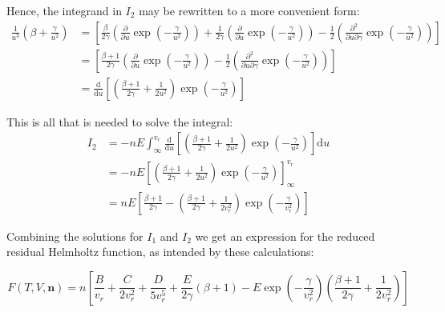 \documentclass[english]{../thermomemo/thermomemo}
\numberwithin{equation}{section}
\newcommand*{\pd}[2]{\frac{\partial #1}{\partial #2}}
\begin{document}
Hence, the integrand in $I_2$ may be rewritten to a more convenient form:
\begin{equation}
\begin{split}
\frac{1}{u^3} \left(\beta + \frac{\gamma}{u^2}\right) 
& = \left[ \frac{\beta}{2 \gamma} \left( \pd{}{u} \exp{\left(-\frac{\gamma}{u^2} \right) } \right) + \frac{1}{2 \gamma} \left( \pd{}{u} \exp{\left(-\frac{\gamma}{u^2} \right) } \right) - \frac{1}{2} \left(\frac{\partial^2}{\partial u \partial \gamma} \exp{\left(-\frac{\gamma}{u^2}\right)} \right) \right] \\
& = \left[\frac{\beta + 1}{2 \gamma} \left( \pd{}{u} \exp{\left(-\frac{\gamma}{u^2} \right)} \right) - \frac{1}{2} \left(\frac{\partial^2}{\partial u \partial \gamma} \exp{\left(-\frac{\gamma}{u^2}\right)} \right) \right] \\
& = \frac{\mathrm{d}}{\mathrm{d}u} \left[\left( \frac{\beta + 1}{2 \gamma} + \frac{1}{2u^2} \right)\exp{\left(-\frac{\gamma}{u^2}\right)} \right] 
\end{split}
\end{equation}

This is all that is needed to solve the integral:
\begin{equation}
\begin{split}
I_2 
& = - n E\int_\infty ^{v_r} \frac{\mathrm{d}}{\mathrm{d}u} \left[\left( \frac{\beta + 1}{2 \gamma} + \frac{1}{2u^2} \right)\exp{\left(-\frac{\gamma}{u^2}\right)} \right]  \mathrm{d}u \\
& =  - n E{ \left[\left( \frac{\beta + 1}{2 \gamma} + \frac{1}{2u^2} \right)\exp{\left(-\frac{\gamma}{u^2}\right)} \right] }_ \infty ^{v_r} \\
& = n E\left[\frac{\beta + 1}{2 \gamma} - \left( \frac{\beta + 1}{2 \gamma} + \frac{1}{2v_r^2} \right)\exp{\left(-\frac{\gamma}{v_r^2}\right)} \right]
\end{split}
\end{equation}

Combining the solutions for $I_1$ and $I_2$ we get an expression for the reduced residual Helmholtz function, as intended by these calculations:

\begin{equation}
F(T,V,\textbf{n}) = n \left[\frac{B}{v_r} + \frac{C}{2 v_r^2} + \frac{D}{5 v_r^5} + \frac{E}{2 \gamma}(\beta + 1) - E\exp{\left(-\frac{\gamma}{v_r^2}\right)} \left( \frac{\beta + 1}{2 \gamma} + \frac{1}{2v_r^2} \right) \right]
\end{equation}

\clearpage
\end{document}
